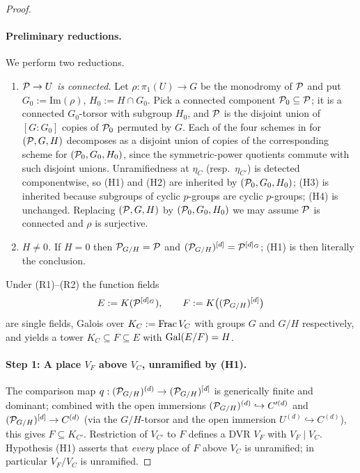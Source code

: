 \documentclass[11pt]{article}
\begin{document}
\begin{proof}
\paragraph{Preliminary reductions.}
We perform two reductions.
\begin{enumerate}
\item[\textnormal{(R1)}] \textit{$\mathcal{P} \to U$ is connected.}  Let
      $\rho \colon \pi_1(U) \to G$ be the monodromy of $\mathcal{P}$ and put
      $G_0 := \mathrm{Im}(\rho)$, $H_0 := H \cap G_0$.  Pick a connected
      component $\mathcal{P}_0 \subseteq \mathcal{P}$; it is a connected $G_0$-torsor with
      subgroup $H_0$, and $\mathcal{P}$ is the disjoint union of $[G : G_0]$ copies
      of $\mathcal{P}_0$ permuted by $G$.  Each of the four schemes in
       for $(\mathcal{P}, G, H)$ decomposes as a
      disjoint union of copies of the corresponding scheme for
      $(\mathcal{P}_0, G_0, H_0)$, since the symmetric-power quotients commute with
      such disjoint unions.  Unramifiedness at $\eta_C$ (resp.\ $\eta_{C'}$)
      is detected componentwise, so (H1) and (H2) are inherited by
      $(\mathcal{P}_0, G_0, H_0)$; (H3) is inherited because subgroups of cyclic
      $p$-groups are cyclic $p$-groups; (H4) is unchanged.  Replacing
      $(\mathcal{P}, G, H)$ by $(\mathcal{P}_0, G_0, H_0)$ we may assume $\mathcal{P}$ is connected
      and $\rho$ is surjective.
\item[\textnormal{(R2)}] \textit{$H \neq 0$.}  If $H = 0$ then $\mathcal{P}_{G/H} = \mathcal{P}$ and
      $(\mathcal{P}_{G/H})^{[d]} = \mathcal{P}^{[d]_G}$; (H1) is then literally the
      conclusion.
\end{enumerate}
Under (R1)--(R2) the function fields
\[
E := K(\mathcal{P}^{[d]_G}), \qquad F := K\bigl((\mathcal{P}_{G/H})^{[d]}\bigr)
\]
are single fields, Galois over $K_C := \operatorname{Frac} V_C$ with groups $G$ and $G/H$
respectively, and  yields a tower
$K_C \subseteq F \subseteq E$ with $\operatorname{Gal}(E/F) = H$.

\paragraph{Step 1: A place $V_F$ above $V_C$, unramified by (H1).}
The comparison map $q : (\mathcal{P}_{G/H})^{(d)} \to (\mathcal{P}_{G/H})^{[d]}$ is generically
finite and dominant; combined with the open immersions
$(\mathcal{P}_{G/H})^{(d)} \hookrightarrow C'^{(d)}$ and
$(\mathcal{P}_{G/H})^{[d]} \to C^{(d)}$ (via the $G/H$-torsor and the open immersion
$U^{(d)} \hookrightarrow C^{(d)}$), this gives $F \subseteq K_{C'}$.
Restriction of $V_{C'}$ to $F$ defines a DVR $V_F$ with $V_F \mid V_C$.
Hypothesis (H1) asserts that \emph{every} place of $F$ above $V_C$ is
unramified; in particular $V_F/V_C$ is unramified.


\end{proof}
\end{document}
